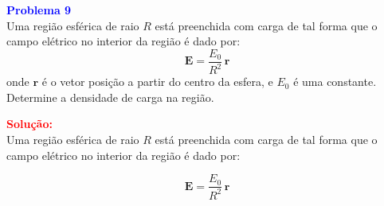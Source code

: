 \documentclass[a4paper,12pt]{article}
\begin{document}
\begin{flushleft}
\textbf{\textcolor{blue}{\Large Problema 9}}\\

Uma região esférica de raio \( R \) está preenchida com carga de tal forma que o campo elétrico no 
interior da região é dado por:
\begin{equation}
\mathbf{E} = \frac{E_0}{R^2} \, \mathbf{r}
\end{equation}
onde \( \mathbf{r} \) é o vetor posição a partir do centro da esfera, e \( E_0 \) é uma constante.\\

\colorbox{red!15}{Determine a densidade de carga na região.}

\begin{center}
\end{center}

\textcolor{red}{\textbf{Solução:}}\\

Uma região esférica de raio \( R \) está preenchida com carga de tal forma que o campo elétrico no interior da região é dado por:

\begin{equation}
\mathbf{E} = \frac{E_0}{R^2} \, \mathbf{r}
\end{equation}


\end{flushleft}
\end{document}
